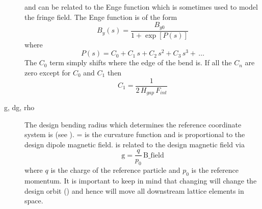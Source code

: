 \begin{description}
 and  can be related to the Enge function which is sometimes used to model the
fringe field. The Enge function is of the form
\begin{equation}
  B_y(s) = \frac{B_{y0}}{1 + \exp[P(s)]}
\end{equation}
where
\begin{equation}
  P(s) = C_0 + C_1 \, s + C_2 \, s^2 + C_3 \, s^3 + \, \ldots
\end{equation}
The $C_0$ term simply shifts where the edge of the bend is. If all the $C_n$ are zero except for
$C_0$ and $C_1$ then
\begin{equation}
  C_1 = \frac{1}{2 \,H_{gap} \, F_{int}}
\end{equation}
  \item[g, dg, rho] \Newline
The design bending radius which determines the reference coordinate system is  (see
).  =  is the curvature function and is proportional to the design
dipole magnetic field.  is related to the design magnetic field  via
\begin{equation}
  \text{g} = \frac{q}{p_0} \, \text{B_field} 
  \label{gqpb}
\end{equation}
where $q$ is the charge of the reference particle and $p_0$ is the reference momentum. It is
important to keep in mind that changing  will change the design orbit () and
hence will move all downstream lattice elements in space.


\end{description}
